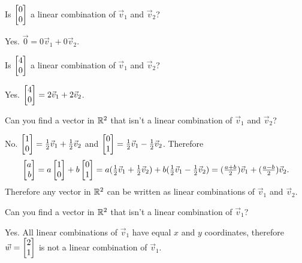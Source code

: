 \documentclass{workbook}
\begin{document}
\begin{slide}
\begin{parts}
		\item Is $\mat{0\\0}$ a linear combination of $\vec v_1$ and $\vec v_2$?
			\begin{solution}[inline]
				Yes. $\vec 0=0\vec v_1+0\vec v_2$.
			\end{solution}
		\item Is $\mat{4\\0}$ a linear combination of $\vec v_1$ and $\vec v_2$?
			\begin{solution}[inline]
				Yes. $\mat{4\\0}=2\vec v_1+2\vec v_2$.
			\end{solution}
		\item Can you find a vector in $\mathbb{R}^2$ that isn't a linear combination of
		$\vec v_1$ and $\vec v_2$?
			\begin{solution}
				No. $\mat{1\\0}=\tfrac{1}{2}\vec v_1+\tfrac{1}{2}\vec v_2$ and
				$\mat{0\\1}=\tfrac{1}{2}\vec v_1-\tfrac{1}{2}\vec v_2$.
				Therefore
				\[
					\mat{a\\b}
					= a\mat{1\\0}+b\mat{0\\1}
					= a(\tfrac{1}{2}\vec v_1+\tfrac{1}{2}\vec v_2)
						+b(\tfrac{1}{2}\vec v_1-\tfrac{1}{2}\vec v_2)
					=(\tfrac{a+b}{2})\vec v_1+(\tfrac{a-b}{2})\vec v_2.
				\]
				Therefore any vector in $\mathbb{R}^2$ can be written as linear combinations
				of $\vec v_1$ and $\vec v_2$.
			\end{solution}
		\item Can you find a vector in $\mathbb{R}^2$ that isn't a linear combination of
			$\vec v_1$?
			\begin{solution}
				Yes. All linear combinations of $\vec v_1$ have equal $x$ and
				$y$ coordinates, therefore $\vec w=\mat{2\\1}$ is not a linear
				combination of $\vec v_1$.
			\end{solution}
	\end{parts}
\end{slide}
\end{document}
